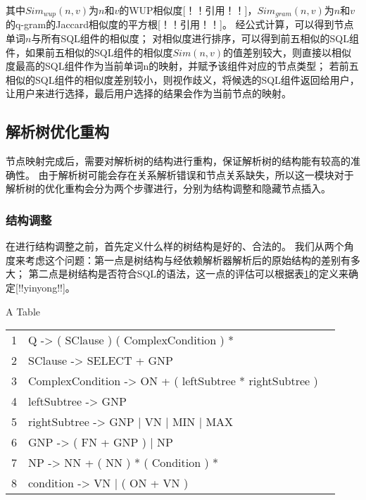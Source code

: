 其中$Sim_{wup}(n,v)$为$n$和$v$的WUP相似度[！！引用！！]，$Sim_{gram}(n,v)$为$n$和$v$的q-gram的Jaccard相似度的平方根[！！引用！！]。
经公式计算，可以得到节点单词$n$与所有SQL组件的相似度；
对相似度进行排序，可以得到前五相似的SQL组件，如果前五相似的SQL组件的相似度$Sim(n,v)$的值差别较大，则直接以相似度最高的SQL组件作为当前单词n的映射，并赋予该组件对应的节点类型；
若前五相似的SQL组件的相似度差别较小，则视作歧义，将候选的SQL组件返回给用户，让用户来进行选择，最后用户选择的结果会作为当前节点的映射。 

\subsection{解析树优化重构}
\label{nli:jxsyhcg}

节点映射完成后，需要对解析树的结构进行重构，保证解析树的结构能有较高的准确性。
由于解析树可能会存在关系解析错误和节点关系缺失，所以这一模块对于解析树的优化重构会分为两个步骤进行，分别为结构调整和隐藏节点插入。

\subsubsection{结构调整}

在进行结构调整之前，首先定义什么样的树结构是好的、合法的。
我们从两个角度来考虑这个问题：第一点是树结构与经依赖解析器解析后的原始结构的差别有多大；
第二点是树结构是否符合SQL的语法，这一点的评估可以根据表\ref{nli:hfjxsjggz}的定义来确定[!!yinyong!!]。

\begin{table}[!hpb]
    \centering
      {A Table}
    \label{nli:hfjxsjggz}
    \begin{tabular}{@{}llr@{}} \toprule
      1  & 	Q -> ( SClause ) ( ComplexCondition ) *\\
      2  & 	SClause -> SELECT + GNP\\
      3  & 	ComplexCondition -> ON + ( leftSubtree * rightSubtree )\\
      4  & 	leftSubtree -> GNP\\
      5  & 	rightSubtree -> GNP | VN | MIN | MAX\\
      6  & 	GNP -> ( FN + GNP ) | NP\\
      7  & 	NP -> NN + ( NN ) * ( Condition ) *\\
      8  & 	condition -> VN | ( ON + VN )\\\bottomrule
    \end{tabular}
  \end{table}

